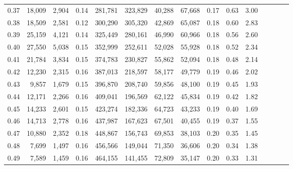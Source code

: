 \begin{tabular}{rrrcrrrrrrrrrrr}
0.37 &  18,009 &  2,904 &                                       0.14 &  281,781 &  323,829 &   40,288 &   67,668 &  0.17 &  0.63 &                         3.00 \\
0.38 &  18,509 &  2,581 &                                       0.12 &  300,290 &  305,320 &   42,869 &   65,087 &  0.18 &  0.60 &                         2.83 \\
0.39 &  25,159 &  4,121 &                                       0.14 &  325,449 &  280,161 &   46,990 &   60,966 &  0.18 &  0.56 &                         2.60 \\
0.40 &  27,550 &  5,038 &                                       0.15 &  352,999 &  252,611 &   52,028 &   55,928 &  0.18 &  0.52 &                         2.34 \\
0.41 &  21,784 &  3,834 &                                       0.15 &  374,783 &  230,827 &   55,862 &   52,094 &  0.18 &  0.48 &                         2.14 \\
0.42 &  12,230 &  2,315 &                                       0.16 &  387,013 &  218,597 &   58,177 &   49,779 &  0.19 &  0.46 &                         2.02 \\
0.43 &   9,857 &  1,679 &                                       0.15 &  396,870 &  208,740 &   59,856 &   48,100 &  0.19 &  0.45 &                         1.93 \\
0.44 &  12,171 &  2,266 &                                       0.16 &  409,041 &  196,569 &   62,122 &   45,834 &  0.19 &  0.42 &                         1.82 \\
0.45 &  14,233 &  2,601 &                                       0.15 &  423,274 &  182,336 &   64,723 &   43,233 &  0.19 &  0.40 &                         1.69 \\
0.46 &  14,713 &  2,778 &                                       0.16 &  437,987 &  167,623 &   67,501 &   40,455 &  0.19 &  0.37 &                         1.55 \\
0.47 &  10,880 &  2,352 &                                       0.18 &  448,867 &  156,743 &   69,853 &   38,103 &  0.20 &  0.35 &                         1.45 \\
0.48 &   7,699 &  1,497 &                                       0.16 &  456,566 &  149,044 &   71,350 &   36,606 &  0.20 &  0.34 &                         1.38 \\
0.49 &   7,589 &  1,459 &                                       0.16 &  464,155 &  141,455 &   72,809 &   35,147 &  0.20 &  0.33 &                         1.31 \\

\end{tabular}
